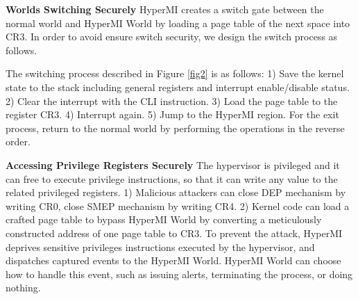 \documentclass[conference]{IEEEtran}
\begin{document}
\textbf{Worlds Switching Securely}
HyperMI creates a switch gate between the normal world and HyperMI World by loading a page table of the next space into CR3.
In order to avoid ensure switch security, we design the switch process as follows.

The switching process described in Figure \ref{fig2} is as follows: 1) Save the kernel state to the stack including general registers and interrupt enable/disable status. 2) Clear the interrupt with the CLI instruction. 3) Load the page table to the register CR3. 4) Interrupt again. 5) Jump to the HyperMI region. For the exit process, return to the normal world by performing the operations in the reverse order.

\textbf{Accessing Privilege Registers Securely}
The hypervisor is pivileged and it can free to execute privilege instructions, so that it can write any value to the related privileged registers. 1) Malicious attackers can close DEP mechanism by writing CR0, close SMEP mechanism by writing CR4. 2) Kernel code can load a crafted page table to bypass HyperMI World by converting a meticulously constructed address of one page table to CR3.
To prevent the attack, HyperMI deprives sensitive privileges instructions executed by the hypervisor, and dispatches captured events to the HyperMI World. HyperMI World can choose how to handle this event, such as issuing alerts, terminating the process, or doing nothing. 
\end{document}

